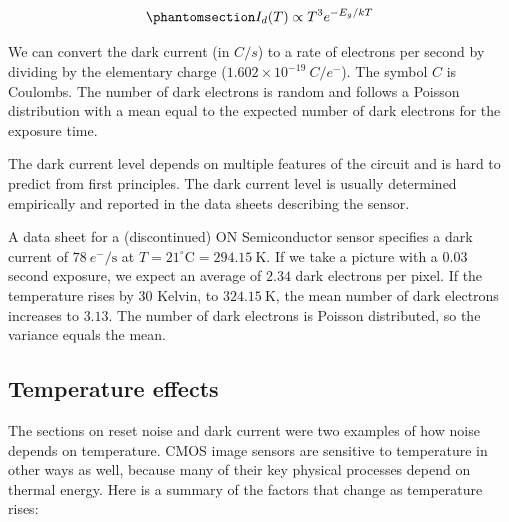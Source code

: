 \documentclass[
  letterpaper,
]{book}
\begin{document}
\begin{equation}\phantomsection\label{eq-sensor-darkcurrent}{
I_d(T) \propto T^3 e^{-E_g/kT}
}\end{equation}

We can convert the dark current (in \(C/s\)) to a rate of electrons per
second by dividing by the elementary charge
(\(1.602 \times 10^{-19}~C/e^-\)). The symbol \(C\) is Coulombs. The
number of dark electrons is random and follows a Poisson distribution
with a mean equal to the expected number of dark electrons for the
exposure time.

The dark current level depends on multiple features of the circuit and
is hard to predict from first principles. The dark current level is
usually determined empirically and reported in the data sheets
describing the sensor.

\begin{tcolorbox}[enhanced jigsaw, colframe=quarto-callout-note-color-frame, titlerule=0mm, rightrule=.15mm, opacitybacktitle=0.6, colback=white, leftrule=.75mm, coltitle=black, title=\textcolor{quarto-callout-note-color}{\faInfo}\hspace{0.5em}{Dark current units}, bottomrule=.15mm, colbacktitle=quarto-callout-note-color!10!white, breakable, left=2mm, bottomtitle=1mm, toptitle=1mm, opacityback=0, arc=.35mm, toprule=.15mm]

A data sheet for a (discontinued) ON Semiconductor sensor specifies a
dark current of \(78~e^{-}/\text{s}\) at
\(T = 21^\circ\text{C} = 294.15~\text{K}\). If we take a picture with a
0.03 second exposure, we expect an average of \(2.34\) dark electrons
per pixel. If the temperature rises by \(30\) Kelvin, to
\(324.15~\text{K}\), the mean number of dark electrons increases to
\(3.13\). The number of dark electrons is Poisson distributed, so the
variance equals the mean.

\end{tcolorbox}

\subsection{Temperature effects}\label{sec-temperature-effects}

The sections on reset noise and dark current were two examples of how
noise depends on temperature. CMOS image sensors are sensitive to
temperature in other ways as well, because many of their key physical
processes depend on thermal energy. Here is a summary of the factors
that change as temperature rises:
\end{document}
